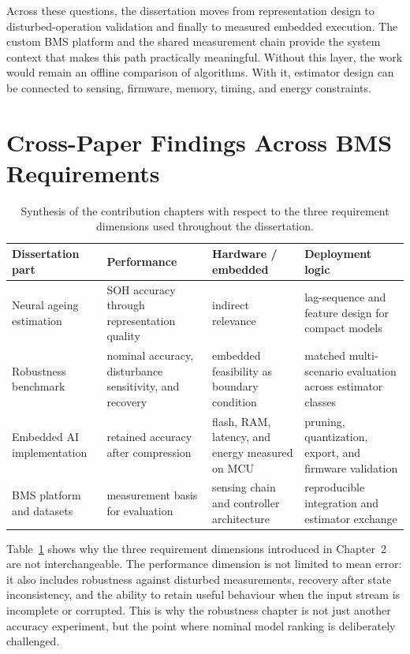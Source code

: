 \documentclass[
    a4paper,
    12pt,
    titlepage,
    bibliography=totoc,
    twoside=on,
    parskip=false,
    numbers=noenddot,
    cleardoublepage=empty,
    DIV=12,
    BCOR=12.0mm,
    headheight=36pt,
    headings=openright
]{scrreprt}
\begin{document}
Across these questions, the dissertation moves from representation design to disturbed-operation validation and finally to measured embedded execution. The custom BMS platform and the shared measurement chain provide the system context that makes this path practically meaningful. Without this layer, the work would remain an offline comparison of algorithms. With it, estimator design can be connected to sensing, firmware, memory, timing, and energy constraints.

\section{Cross-Paper Findings Across BMS Requirements}
\begin{table}[H]
    \centering
    \small
    \caption[Synthesis of contribution chapters and requirement dimensions.]{Synthesis of the contribution chapters with respect to the three requirement dimensions used throughout the dissertation.}
    \label{tab:synthesis_matrix}
    \begin{tabularx}{\textwidth}{>{\raggedright\arraybackslash}p{3.8cm}>{\raggedright\arraybackslash}p{2.7cm}>{\raggedright\arraybackslash}p{2.7cm}>{\raggedright\arraybackslash}X}
        \toprule
        Dissertation part & Performance & Hardware / embedded & Deployment logic \\
        \midrule
        Neural ageing estimation & SOH accuracy through representation quality & indirect relevance & lag-sequence and feature design for compact models \\
        Robustness benchmark & nominal accuracy, disturbance sensitivity, and recovery & embedded feasibility as boundary condition & matched multi-scenario evaluation across estimator classes \\
        Embedded AI implementation & retained accuracy after compression & flash, RAM, latency, and energy measured on MCU & pruning, quantization, export, and firmware validation \\
        BMS platform and datasets & measurement basis for evaluation & sensing chain and controller architecture & reproducible integration and estimator exchange \\
        \bottomrule
    \end{tabularx}
\end{table}

Table~\ref{tab:synthesis_matrix} shows why the three requirement dimensions introduced in Chapter~2 are not interchangeable. The performance dimension is not limited to mean error: it also includes robustness against disturbed measurements, recovery after state inconsistency, and the ability to retain useful behaviour when the input stream is incomplete or corrupted. This is why the robustness chapter is not just another accuracy experiment, but the point where nominal model ranking is deliberately challenged.
\end{document}
